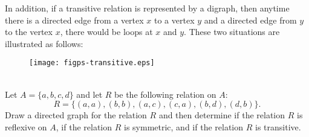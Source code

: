 \begin{itemize}
In addition, if a transitive relation is represented by a digraph, then anytime there is a directed edge from a vertex  $x$  to a vertex $y$ and a directed edge from  $y$  to the vertex $x$, there would be loops at  $x$ and  $y$.  These two situations are illustrated as follows:
\begin{figure}[h]
\begin{center}
\texttt{[image: figps-transitive.eps]}
\end{center}
\end{figure}
\end{itemize}

\begin{prog} \label{prog:proprelations} \hfill \\
Let  $A = \{ a, b, c, d \}$ and let $R$ be the following relation on $A$:
\[
R = \{ (a, a), (b, b), (a, c), (c, a), (b, d), (d, b) \}.
\]
Draw a directed graph for the relation $R$ and then determine if the relation $R$ is reflexive on $A$, if the relation $R$ is symmetric, and if the relation $R$ is transitive.
\end{prog}
\hbreak

\endinput
